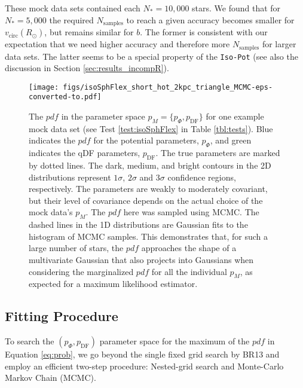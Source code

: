 \documentclass[iop,revtex4,numberedappendix,appendixfloats]{emulateapj}
\newcommand{\pdf}{\ensuremath{pdf}}
\newcommand{\pmodel}{\ensuremath{p_M}}
\begin{document}
These mock data sets contained each $N_{*}=10,000$ stars. We found that for $N_{*}=5,000$ the required $N_\text{samples}$ to reach a given accuracy becomes smaller for $v_\text{circ}(R_\odot)$, but remains similar for $b$. The former is consistent with our expectation that we need higher accuracy and therefore more $N_\text{samples}$ for larger data sets. The latter seems to be a special property of the \texttt{Iso-Pot} (see also the discussion in Section \ref{sec:results_incompR}).


\begin{figure*}[!htbp]
\centering
\texttt{[image: figs/isoSphFlex\_short\_hot\_2kpc\_triangle\_MCMC-eps-converted-to.pdf]}
\caption{The \pdf{} in the parameter space $\pmodel{} = \{p_\Phi,p_\text{DF}\}$ for one example mock data set (see Test \ref{test:isoSphFlex} in Table \ref{tbl:tests}). Blue indicates the \pdf{} for the potential parameters, $p_\Phi$, and green indicates the qDF parameters, $p_\text{DF}$. The true parameters are marked by dotted lines. The dark, medium, and bright contours in the 2D distributions represent $1\sigma$, $2\sigma$ and $3\sigma$ confidence regions, respectively. The parameters are weakly to moderately covariant, but their level of covariance depends on the actual choice of the mock data's \pmodel{}. The \pdf{} here was sampled using MCMC. The dashed lines in the 1D distributions are Gaussian fits to the histogram of MCMC samples. This demonstrates that, for such a large number of stars, the \pdf{} approaches the shape of a multivariate Gaussian that also projects into Gaussians when considering the marginalized \pdf{} for all the individual \pmodel{}, as expected for a maximum likelihood estimator.}
\label{fig:isoSphFlex_triangleplot}
\end{figure*}

\subsection{Fitting Procedure} \label{sec:fitting}

To search the $(p_\Phi,p_\text{DF})$ parameter space for the maximum of the \pdf{} in Equation \eqref{eq:prob}, we go beyond the single fixed grid search by BR13 and employ an efficient two-step procedure: Nested-grid search and Monte-Carlo Markov Chain (MCMC).
\end{document}
